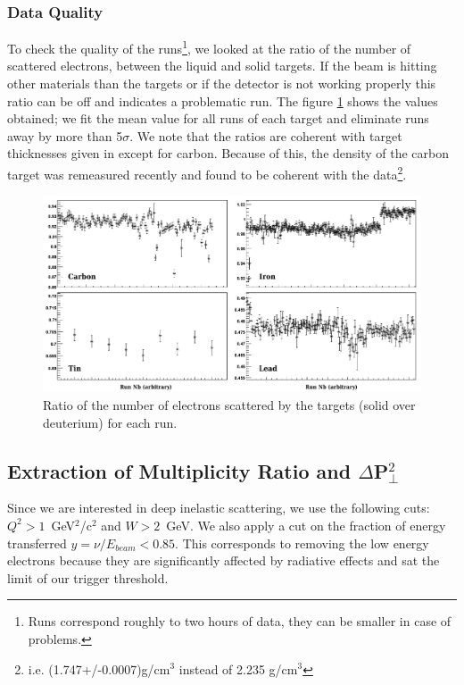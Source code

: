 \subsubsection{Data Quality}

To check the quality of the runs\footnote{Runs correspond roughly to two hours
of data, they can be smaller in case of problems.}, we looked at the ratio of the number of 
scattered electrons, between the liquid and solid targets. If the beam is 
hitting other materials than the targets or if the detector is not working 
properly this ratio can be off and indicates a problematic run. The figure 
\ref{DataQ} shows the values obtained; we fit the 
mean value for all runs of each target and eliminate runs away by more than 
5$\sigma$. We note that the ratios are coherent with target thicknesses given 
in \cite{Hakobyan:2008zz} except for carbon. Because of this, the density of 
the carbon target was remeasured recently and found to be coherent with the 
data\footnote{i.e. (1.747+/-0.0007)g/cm$^3$ instead of 2.235 g/cm$^3$}.

\begin{figure}[tbp]
\centering
\includegraphics[width=15cm] {chap5-fig/TargetElRatio.png}
\caption {Ratio of the number of electrons scattered by the targets (solid over deuterium) 
for each run.}
\label{DataQ}
\end{figure}

\subsection{Extraction of Multiplicity Ratio and $\Delta$P$_\perp^2$}
\label{sec:obs}

Since we are interested in deep inelastic scattering, we use the following 
cuts: $Q^2 > 1$~GeV$^2$/c$^2$ and $W > 2$~GeV. We also apply a cut on the 
fraction of energy transferred $y = \nu/E_{beam} < 0.85$.
This corresponds to removing the low energy electrons because they are
significantly affected by radiative effects and sat the limit of our trigger 
threshold.

